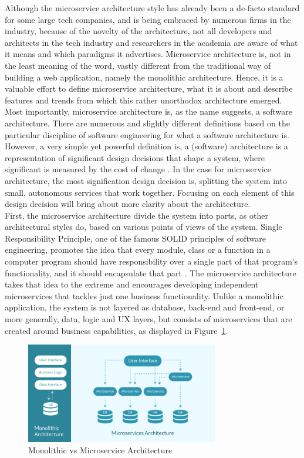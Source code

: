 \documentclass{Configuration_Files/PoliMi3i_thesis}
\begin{document}
Although the microservice architecture style has already been a de-facto standard for some large tech companies, and is being embraced by numerous firms in the industry, because of the novelty of the architecture, not all developers and architects in the tech industry and researchers in the academia are aware of what it means and which paradigms it advertises.
Microservice architecture is, not in the least meaning of the word, vastly different from the traditional way of building a web application, namely the monolithic architecture.
Hence, it is a valuable effort to define microservice architecture, what it is about and describe features and trends from which this rather unorthodox architecture emerged.
\\
Most importantly, microservice architecture is, as the name suggests, a software architecture.
There are numerous and slightly different definitions based on the particular discipline of software engineering for what a software architecture is.
However, a very simple yet powerful definition is, a (software) architecture is a representation of significant design decisions that shape a system, where significant is measured by the cost of change \cite{booch}. 
In the case for microservice architecture, the most signification design decision is, splitting the system into small, autonomous services that work together.
Focusing on each element of this design decision will bring about more clarity about the architecture.
\\
First, the microservice architecture divide the system into parts, as other architectural styles do, based on various points of views of the system.
Single Responsibility Principle, one of the famous SOLID principles of software engineering, promotes the idea that every module, class or a function in a computer program should have responsibility over a single part of that program's functionality, and it should encapsulate that part \cite{srp}.
The microservice architecture takes that idea to the extreme and encourages developing independent microservices that tackles just one business functionality.
Unlike a monolithic application, the system is not layered as database, back-end and front-end, or more generally, data, logic and UX layers, but consists of microservices that are created around business capabilities, as displayed in Figure~\ref{fig:monovsmicro}.

\begin{figure}[H]
    \centering
    \includegraphics[width=0.75\textwidth]{myImages/monolithic-vs-microservices.png}
    \caption{Monolithic vs Microservice Architecture}
    \label{fig:monovsmicro}
\end{figure}
\end{document}
